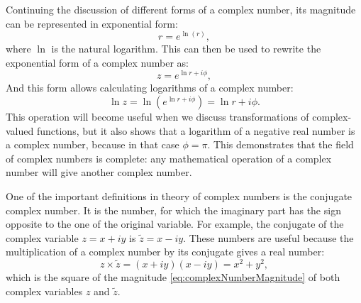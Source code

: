 \documentclass[
]{book}
\begin{document}
Continuing the discussion of different forms of a complex number, its magnitude can be represented in exponential form:
\begin{equation*}
    r = e^{\ln(r)},
\end{equation*}
where \(\ln\) is the natural logarithm. This can then be used to rewrite the exponential form of a complex number as:
\begin{equation}
    z = e^{\ln r + i \phi} ,
    \label{eq:complexNumberExponentialAll}
\end{equation}
And this form allows calculating logarithms of a complex number:
\begin{equation*}
    \ln z = \ln \left(e^{\ln r + i \phi} \right) = \ln r + i \phi .
\end{equation*}
This operation will become useful when we discuss transformations of complex-valued functions, but it also shows that a logarithm of a negative real number is a complex number, because in that case \(\phi=\pi\). This demonstrates that the field of complex numbers is complete: any mathematical operation of a complex number will give another complex number.

One of the important definitions in theory of complex numbers is the conjugate complex number. It is the number, for which the imaginary part has the sign opposite to the one of the original variable. For example, the conjugate of the complex variable \(z = x+ iy\) is \(\tilde{z} = x- iy\). These numbers are useful because the multiplication of a complex number by its conjugate gives a real number:
\begin{equation}
    z \times \tilde{z} = (x+ iy) (x- iy) = x^2 + y^2 ,
    \label{eq:complexNumberConjugateMulti}
\end{equation}
which is the square of the magnitude \eqref{eq:complexNumberMagnitude} of both complex variables \(z\) and \(\tilde{z}\).
\end{document}
